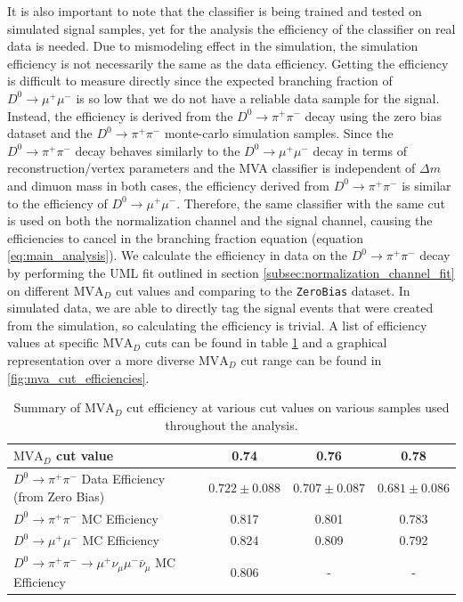 It is also important to note that the classifier is being trained and tested on simulated signal samples, yet for the analysis the efficiency of the classifier on real data is needed. Due to mismodeling effect in the simulation, the simulation efficiency is not necessarily the same as the data efficiency. Getting the efficiency is difficult to measure directly since the expected branching fraction of $D^0 \to \mu^+ \mu^-$ is so low that we do not have a reliable data sample for the signal. Instead, the efficiency is derived from the $D^0 \to \pi^+ \pi^-$ decay using the zero bias dataset and the $D^0 \to \pi^+ \pi^-$ monte-carlo simulation samples. Since the $D^0 \to \pi^+ \pi^-$ decay behaves similarly to the $D^0 \to \mu^+ \mu^-$ decay in terms of reconstruction/vertex parameters and the MVA classifier is independent of $\Delta m$ and dimuon mass in both cases, the efficiency derived from $D^0 \to \pi^+ \pi^-$ is similar to the efficiency of $D^0 \to \mu^+ \mu^-$. Therefore, the same classifier with the same cut is used on both the normalization channel and the signal channel, causing the efficiencies to cancel in the branching fraction equation (equation \ref{eq:main_analysis}). We calculate the efficiency in data on the $D^0 \to \pi^+ \pi^-$ decay by performing the UML fit outlined in section \ref{subsec:normalization_channel_fit} on different $\text{MVA}_D$ cut values and comparing to the \texttt{ZeroBias} dataset. In simulated data, we are able to directly tag the signal events that were created from the simulation, so calculating the efficiency is trivial. A list of efficiency values at specific $\text{MVA}_D$ cuts can be found in table \ref{tab:mva_cut_efficiencies} and a graphical representation over a more diverse $\text{MVA}_D$ cut range can be found in \ref{fig:mva_cut_efficiencies}.

\begin{table}[htbp]
    \centering
    \begin{tabular}{|l|c|c|c|}
    \hline
    $\text{MVA}_D$ cut value & \textbf{0.74} & \textbf{0.76} & \textbf{0.78} \\
    \hline
    $D^0 \to \pi^+ \pi^-$ Data Efficiency (from Zero Bias) & $0.722 \pm 0.088$ & $0.707 \pm 0.087$ & $0.681 \pm 0.086$ \\
    $D^0 \to \pi^+ \pi^-$ MC Efficiency & 0.817 & 0.801 & 0.783 \\
    $D^0 \to \mu^+ \mu^-$ MC Efficiency & 0.824 & 0.809 & 0.792 \\
    $D^0 \to \pi^+ \pi^- \to \mu^+\nu_\mu\mu^-\bar{\nu}_\mu$ MC Efficiency & 0.806 & - & - \\
    \hline
    \end{tabular}
    \caption{Summary of $\text{MVA}_D$ cut efficiency at various cut values on various samples used throughout the analysis.}
    \label{tab:mva_cut_efficiencies}
\end{table}


